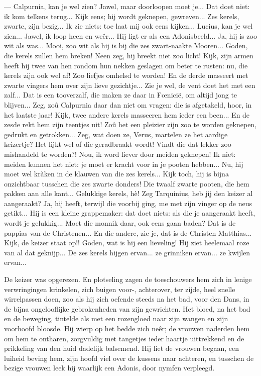 \documentclass[a4paper, 12pt, oneside, dutch]{article}
\begin{document}
--- Calpurnia, kan je wel zien? Jawel, maar doorloopen moet je... Dat doet niet: ik kom telkens terug... Kijk eens; hij wordt geknepen, gewreven... Zes kerels, zwarte, zijn bezig... Ik zie niets: toe laat mij ook eens kijken... Lucius, kan je wel zien... Jawel, ik loop heen en weêr... Hij ligt er als een Adonisbeeld... Ja, hij is zoo wit als was... Mooi, zoo wit als hij is bij die zes zwart-naakte Mooren... Goden, die kerels zullen hem breken! Neen zeg, hij breekt niet zoo licht! Kijk, zijn armen heeft hij twee van hen rondom hun nekken geslagen om beter te rusten: nu, die kerels zijn ook wel af! Zoo liefjes omhelsd te worden! En de derde masseert met zwarte vingers hem over zijn lieve gezichtje... Zie je wel, de vent doet het met een zalf... Dat is een tooverzalf, die maken ze daar in Fœnicië, om altijd jong te blijven... Zeg, zoû Calpurnia daar dan niet om vragen: die is afgetakeld, hoor, in het laatste jaar! Kijk, twee andere kerels masseeren hem ieder een been... En de zesde rekt hem zijn teentjes uit! Zoû het een pleizier zijn zoo te worden geknepen, gedrukt en getrokken... Zeg, wat doen ze, Verus, martelen ze het aardige keizertje? Het lijkt wel of die geradbraakt wordt! Vindt die dat lekker zoo mishandeld te worden?! Nou, ik word liever door meiden geknepen! Ik niet: meiden kunnen het niet: je moet er kracht voor in je pooten hebben... Nu, hij moet wel kràken in de klauwen van die zes kerels... Kijk toch, hij is bijna onzichtbaar tusschen die zes zwarte donders! Die twaalf zwarte pooten, die hem pakken aan alle kant... Gelukkige kerels, hè! Zeg Tarquinius, heb jij den keizer al aangeraakt? Ja, hij heeft, terwijl die voorbij ging, me met zijn vinger op de neus getikt... Hij is een kleine grappemaker: dat doet niets: als die je aangeraakt heeft, wordt je gelukkig... Moet die monnik daar, ook eens gaan baden? Dat is de pappias van de Christenen... En die andere, zie je, dat is de Christen Matthias... Kijk, de keizer staat op!! Goden, wat is hij een lieveling! Hij ziet heelemaal roze van al dat geknijp... De zes kerels hijgen ervan... ze grinniken ervan... ze kwijlen ervan...

De keizer was opgerezen. En plotseling zagen de toeschouwers hem zich in lenige verwringingen krinkelen, zich buigen voor-, achterover, ter zijde, heel snelle wirrelpassen doen, zoo als hij zich oefende steeds na het bad, voor den Dans, in de bijna ongelooflijke gebrokenheden van zijn gewrichten. Het bloed, na het bad en de beweging, tintelde als met een rozengloed naar zijn wangen en zijn voorhoofd bloosde. Hij wierp op het bedde zich neêr; de vrouwen naderden hem om hem te ontharen, zorgvuldig met tangetjes ieder haartje uittrekkend en de prikkeling van den huid dadelijk balsemend. Hij liet de vrouwen begaan, een luiheid beving hem, zijn hoofd viel over de kussens naar achteren, en tusschen de bezige vrouwen leek hij waarlijk een Adonis, door nymfen verpleegd.
\end{document}
